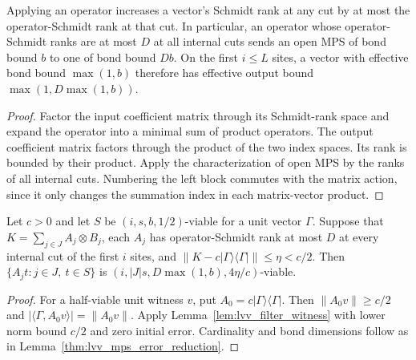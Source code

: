 \begin{lemma}
    \label{lem:lvv_operator_bond_growth}
    \leanok
    Applying an operator increases a vector's Schmidt rank at any cut by
    at most the operator-Schmidt rank at that cut. In particular, an
    operator whose operator-Schmidt ranks are at most $D$ at all internal
    cuts sends an open MPS of bond bound $b$ to one of bond bound $Db$.
    On the first $i\le L$ sites, a vector with effective bond bound
    $\max(1,b)$ therefore has effective output bound
    $\max(1,D\max(1,b))$.
\end{lemma}
\begin{proof}
    \leanok
    Factor the input coefficient matrix through its Schmidt-rank space
    and expand the operator into a minimal sum of product operators.
    The output coefficient matrix factors through the product of the two
    index spaces. Its rank is bounded by their product. Apply the
    characterization of open MPS by the ranks of all internal cuts.
    Numbering the left block commutes with the matrix action, since it
    only changes the summation index in each matrix-vector product.
\end{proof}

\begin{lemma}
    \label{thm:lvv_scaled_projection_error_reduction}
    \leanok
    Let $c>0$ and let $S$ be $(i,s,b,1/2)$-viable for a unit vector
    $\Gamma$. Suppose that $K=\sum_{j\in J}A_j\otimes B_j$,
    each $A_j$ has operator-Schmidt rank at most $D$ at every internal
    cut of the first $i$ sites, and
    $\|K-c|\Gamma\rangle\langle\Gamma|\|\le\eta<c/2$.
    Then $\{A_jt:j\in J,\ t\in S\}$ is
    $(i,|J|s,D\max(1,b),4\eta/c)$-viable.
\end{lemma}
\begin{proof}
    \leanok
    For a half-viable unit witness $v$, put
    $A_0=c|\Gamma\rangle\langle\Gamma|$. Then
    $\|A_0v\|\ge c/2$ and
    $|\langle\Gamma,A_0v\rangle|=\|A_0v\|$.
    Apply Lemma~\ref{lem:lvv_filter_witness} with lower norm bound
    $c/2$ and zero initial error. Cardinality and bond dimensions follow
    as in Lemma~\ref{thm:lvv_mps_error_reduction}.
\end{proof}
